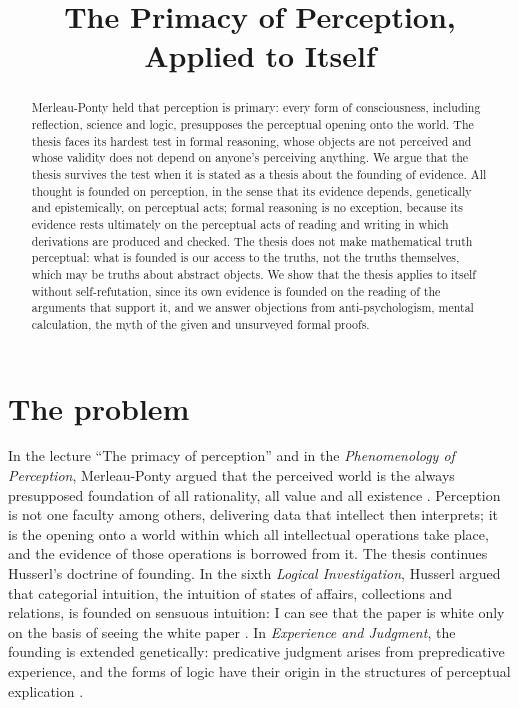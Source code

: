 \documentclass{situationist-preprint}
\title{The Primacy of Perception, Applied to Itself}
\begin{document}
\maketitle

\begin{abstract}
Merleau-Ponty held that perception is primary: every form of consciousness, including reflection, science and logic, presupposes the perceptual opening onto the world. The thesis faces its hardest test in formal reasoning, whose objects are not perceived and whose validity does not depend on anyone's perceiving anything. We argue that the thesis survives the test when it is stated as a thesis about the founding of evidence. All thought is founded on perception, in the sense that its evidence depends, genetically and epistemically, on perceptual acts; formal reasoning is no exception, because its evidence rests ultimately on the perceptual acts of reading and writing in which derivations are produced and checked. The thesis does not make mathematical truth perceptual: what is founded is our access to the truths, not the truths themselves, which may be truths about abstract objects. We show that the thesis applies to itself without self-refutation, since its own evidence is founded on the reading of the arguments that support it, and we answer objections from anti-psychologism, mental calculation, the myth of the given and unsurveyed formal proofs.
\end{abstract}

\section{The problem}

In the lecture \enquote{The primacy of perception} and in the \emph{Phenomenology of Perception}, Merleau-Ponty argued that the perceived world is the always presupposed foundation of all rationality, all value and all existence \citep{MerleauPonty1945,MerleauPonty1964}. Perception is not one faculty among others, delivering data that intellect then interprets; it is the opening onto a world within which all intellectual operations take place, and the evidence of those operations is borrowed from it. The thesis continues Husserl's doctrine of founding. In the sixth \emph{Logical Investigation}, Husserl argued that categorial intuition, the intuition of states of affairs, collections and relations, is founded on sensuous intuition: I can see that the paper is white only on the basis of seeing the white paper \citep[VI, §§40--48]{Husserl1901}. In \emph{Experience and Judgment}, the founding is extended genetically: predicative judgment arises from prepredicative experience, and the forms of logic have their origin in the structures of perceptual explication \citep{Husserl1939}.
\end{document}
